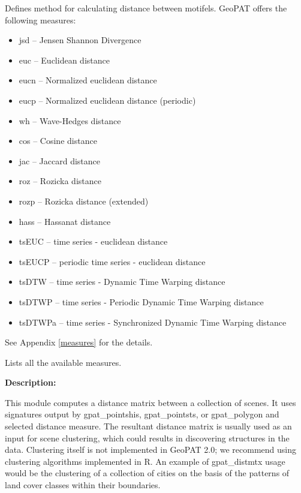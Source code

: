 


Defines method for calculating distance between motifels. 
GeoPAT offers the following measures: 
\begin{itemize}
	\item jsd -- Jensen Shannon Divergence
	\item euc -- Euclidean distance
	\item eucn -- Normalized euclidean distance
	\item eucp -- Normalized euclidean distance (periodic)
	\item wh -- Wave-Hedges distance
	\item cos -- Cosine distance
	\item jac -- Jaccard distance
	\item roz -- Rozicka distance
	\item rozp -- Rozicka distance (extended)
	\item hass -- Hassanat distance
	\item tsEUC -- time series - euclidean distance
	\item tsEUCP -- periodic time series - euclidean distance
	\item tsDTW -- time series - Dynamic Time Warping distance
	\item tsDTWP -- time series - Periodic Dynamic Time Warping distance
	\item tsDTWPa -- time series - Synchronized Dynamic Time Warping distance
\end{itemize}
See Appendix \ref{measures} for the details.


Lists all the available measures.


{\bf Description:}

This module computes a distance matrix between a collection of scenes. 
It uses signatures output by gpat\_pointshis, gpat\_pointsts, or gpat\_polygon and selected distance measure.
The resultant distance matrix is usually used as an input for scene clustering, which could results in discovering structures in the data.
Clustering itself is not implemented in GeoPAT 2.0; we recommend using clustering algorithms implemented in R. %
An example of gpat\_distmtx usage would be the clustering of a collection of cities on the basis of the patterns of land cover classes within their boundaries.

